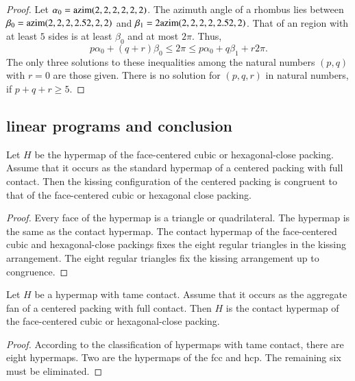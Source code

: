 \begin{proof} Let $\alpha_0 = {\operatorname{azim}}(2,2,2,2,2,2)$.  The azimuth angle of a rhombus lies between $\beta_0 = {\operatorname{azim}}(2,2,2,2.52,2,2)$ and
$\beta_1 = 2{\operatorname{azim}}(2,2,2,2,2.52,2)$.  That of an region with at least $5$ sides is at least $\beta_0$ and at most $2\pi$.  Thus,
$$
p\alpha_0 + (q+r) \beta_0 \le 2\pi \le p\alpha_0 + q\beta_1 + r 2\pi.
$$
The only three solutions to these inequalities among the natural numbers $(p,q)$ with $r=0$ are those given. There is no solution for $(p,q,r)$ in natural numbers, if $p+q+r\ge 5$.
\end{proof}





\subsection{linear programs and conclusion}

\begin{lemma}\label{lemma:kiss-fcc} Let $H$ be the hypermap of the face-centered cubic or hexagonal-close packing.   Assume that it occurs as the standard hypermap of a centered packing with full contact.  Then the kissing configuration of the centered packing is congruent to that of the face-centered cubic or hexagonal close packing.
\end{lemma}
%
%
%
%
%

\begin{proof} Every face of the hypermap is a triangle or quadrilateral.  The  hypermap is the same as the contact hypermap.  The contact hypermap of the face-centered cubic and hexagonal-close packings fixes the eight regular triangles in the kissing arrangement.  The eight regular triangles fix the kissing arrangement up to congruence.
\end{proof}

\begin{lemma}\label{lemma:fcc-ft} Let $H$ be a hypermap with tame contact.  Assume that it occurs as the aggregate fan of a centered packing with full contact.  Then $H$ is the contact hypermap of the face-centered cubic or hexagonal-close packing.
\end{lemma}

\begin{proof} According to the classification of hypermaps with tame contact, there are eight hypermaps.  Two are the hypermaps of the fcc and hcp.  The remaining six must be eliminated.
\end{proof}

